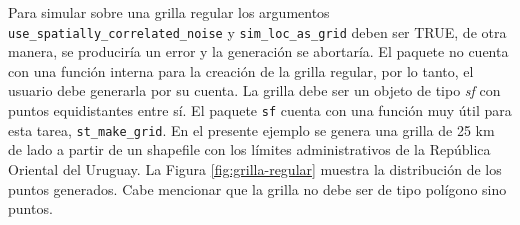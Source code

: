 \documentclass[
  12pt]{article}
\begin{document}
Para simular sobre una grilla regular los argumentos \texttt{use\_spatially\_correlated\_noise} y \texttt{sim\_loc\_as\_grid} deben ser TRUE, de otra manera, se produciría un error y la generación se abortaría.
El paquete no cuenta con una función interna para la creación de la grilla regular, por lo tanto, el usuario debe generarla por su cuenta. La grilla debe ser un objeto de tipo \emph{sf} con puntos equidistantes entre sí. El paquete \texttt{sf} cuenta con una función muy útil para esta tarea, \texttt{st\_make\_grid}. En el presente ejemplo se genera una grilla de 25 km de lado a partir de un shapefile con los límites administrativos de la República Oriental del Uruguay. La Figura \ref{fig:grilla-regular} muestra la distribución de los puntos generados. Cabe mencionar que la grilla no debe ser de tipo polígono sino puntos.
\end{document}
